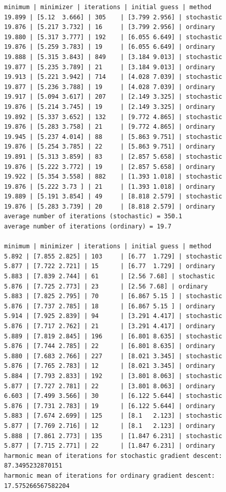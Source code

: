 \documentclass{article}
\begin{document}
\begin{verbatim}
minimum | minimizer | iterations | initial guess | method
19.899 | [5.12  3.666] | 305    | [3.799 2.956] | stochastic
19.876 | [5.217 3.732] | 16     | [3.799 2.956] | ordinary
19.880 | [5.317 3.777] | 192    | [6.055 6.649] | stochastic
19.876 | [5.259 3.783] | 19     | [6.055 6.649] | ordinary
19.888 | [5.315 3.843] | 849    | [3.184 9.013] | stochastic
19.877 | [5.235 3.789] | 21     | [3.184 9.013] | ordinary
19.913 | [5.221 3.942] | 714    | [4.028 7.039] | stochastic
19.877 | [5.236 3.788] | 19     | [4.028 7.039] | ordinary
19.917 | [5.094 3.617] | 207    | [2.149 3.325] | stochastic
19.876 | [5.214 3.745] | 19     | [2.149 3.325] | ordinary
19.892 | [5.337 3.652] | 132    | [9.772 4.865] | stochastic
19.876 | [5.283 3.758] | 21     | [9.772 4.865] | ordinary
19.945 | [5.237 4.014] | 88     | [5.863 9.751] | stochastic
19.876 | [5.254 3.785] | 22     | [5.863 9.751] | ordinary
19.891 | [5.313 3.859] | 83     | [2.857 5.658] | stochastic
19.876 | [5.222 3.772] | 19     | [2.857 5.658] | ordinary
19.922 | [5.354 3.558] | 882    | [1.393 1.018] | stochastic
19.876 | [5.222 3.73 ] | 21     | [1.393 1.018] | ordinary
19.889 | [5.191 3.854] | 49     | [8.818 2.579] | stochastic
19.876 | [5.283 3.739] | 20     | [8.818 2.579] | ordinary
average number of iterations (stochastic) = 350.1
average number of iterations (ordinary) = 19.7

minimum | minimizer | iterations | initial guess | method
5.892 | [7.855 2.825] | 103     | [6.77  1.729] | stochastic
5.877 | [7.722 2.721] | 15      | [6.77  1.729] | ordinary
5.883 | [7.839 2.744] | 61      | [2.56 7.68] | stochastic
5.876 | [7.725 2.773] | 23      | [2.56 7.68] | ordinary
5.883 | [7.825 2.795] | 70      | [6.867 5.15 ] | stochastic
5.876 | [7.737 2.785] | 18      | [6.867 5.15 ] | ordinary
5.914 | [7.925 2.839] | 94      | [3.291 4.417] | stochastic
5.876 | [7.717 2.762] | 21      | [3.291 4.417] | ordinary
5.889 | [7.819 2.845] | 196     | [6.801 8.635] | stochastic
5.876 | [7.744 2.785] | 22      | [6.801 8.635] | ordinary
5.880 | [7.683 2.766] | 227     | [8.021 3.345] | stochastic
5.876 | [7.765 2.783] | 12      | [8.021 3.345] | ordinary
5.884 | [7.793 2.833] | 192     | [3.801 8.063] | stochastic
5.877 | [7.727 2.781] | 22      | [3.801 8.063] | ordinary
6.603 | [7.499 3.566] | 30      | [6.122 5.644] | stochastic
5.876 | [7.731 2.783] | 19      | [6.122 5.644] | ordinary
5.883 | [7.674 2.699] | 125     | [8.1   2.123] | stochastic
5.877 | [7.769 2.716] | 12      | [8.1   2.123] | ordinary
5.888 | [7.861 2.773] | 135     | [1.847 6.231] | stochastic
5.877 | [7.715 2.771] | 22      | [1.847 6.231] | ordinary
harmonic mean of iterations for stochastic gradient descent: 87.3495232870151
harmonic mean of iterations for ordinary gradient descent: 17.575266567582204
\end{verbatim}
\end{document}
